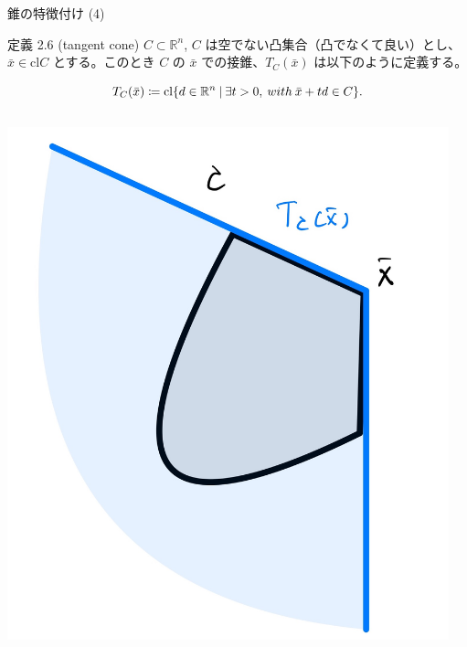 \documentclass[aspectratio=169, dvipdfmx, 11pt]{beamer} %
\begin{document}
\begin{frame}{錐の特徴付け (4)}
  \begin{block}{定義 2.6 (tangent cone) }
    $C \subset \mathbb{R}^n$, $C$ は空でない凸集合（凸でなくて良い）とし、$\bar{x} \in \text{cl}C$ とする。このとき $C$ の $\bar{x}$ での接錐、$T_C(\bar{x})$ は以下のように定義する。

    \begin{equation}
      T_C(\bar{x}) \coloneqq \text{cl}\{ d \in \mathbb{R}^n \:|\: \exists t > 0, \:with\: \bar{x} + td \in C \}. \notag
    \end{equation}

  \end{block}

  \centering
  \begin{columns}
    \begin{column}{0.48\textwidth}
      \includegraphics[keepaspectratio, scale=0.06]{figures/tangent_cone_1.jpg}
    \end{column}
    \begin{column}{0.48\textwidth}

\end{column}
\end{columns}
\end{frame}
\end{document}
